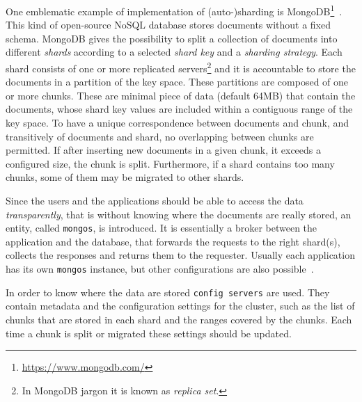 One emblematic example of implementation of (auto-)sharding is
MongoDB\footnote{\url{https://www.mongodb.com/}}~\cite{bib:mongodb}. This kind
of open-source NoSQL database stores documents without a fixed schema.
MongoDB gives the possibility to split a collection of documents into 
different \emph{shards} according to a selected \emph{shard key} and a 
\emph{sharding strategy}. Each shard consists of one or more replicated 
servers\footnote{In MongoDB jargon it is known as \emph{replica set}.} and
it is accountable to store the documents in a partition of the key space.
These partitions are composed of one or more chunks. These are minimal piece of
data (default 64MB) that contain the documents, whose shard key values are
included within a contiguous range of the key space. To have a unique 
correspondence between documents and chunk, and transitively of documents
and shard, no overlapping between chunks are permitted.
If after inserting new documents in a given chunk, it exceeds a configured
size, the chunk is split. Furthermore, if a shard contains too many chunks,
some of them may be migrated to other shards.


Since the users and the applications should be able to access the data 
\emph{transparently}, that is without knowing where the documents are really 
stored, an entity, called \texttt{mongos}, is introduced. It is essentially a 
broker between the application and the database, that forwards the requests to 
the right shard(s), collects the responses and returns them to the requester. 
Usually each application has its own \texttt{mongos} instance, but other 
configurations are also possible~\cite{bib:mongodb}.

In order to know where the data are stored \texttt{config servers} are
used. They contain metadata and the configuration settings for the 
cluster, such as the list of chunks that are stored in each shard and the ranges
covered by the chunks. Each time a chunk is split or migrated these settings
should be updated.

